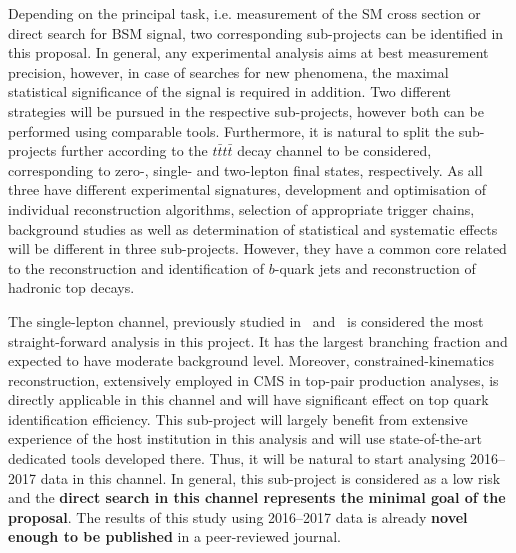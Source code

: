 Depending on the principal task, i.e. measurement of the SM cross section or direct search for BSM signal, two corresponding sub-projects can be identified in this proposal. In general, any experimental analysis aims at best measurement precision, however, in case of searches for new phenomena, the maximal statistical significance of the signal is required in addition.
%
Two different strategies will be pursued in the respective sub-projects, however both can be performed using comparable tools. Furthermore, it is natural to split the sub-projects further according to the $t\bar{t}t\bar{t}$ decay channel to be considered, corresponding to zero-, single- and two-lepton final states, respectively. As all three have different experimental signatures, development and optimisation of individual reconstruction algorithms, selection of appropriate trigger chains, background studies as well as determination of statistical and systematic effects will be different in three sub-projects. However, they have a common core related to the reconstruction and identification of $b$-quark jets and reconstruction of hadronic top decays.

The single-lepton channel, previously studied in~\cite{CMS:2016wig,Beck:2016hyi} and~\cite{Khachatryan:2014sca} is considered the most straight-forward analysis in this project. It has the largest branching fraction and expected to have moderate background level. Moreover, constrained-kinematics reconstruction, extensively employed in CMS in top-pair production analyses, is directly applicable in this channel and will have significant effect on top quark identification efficiency. This sub-project will largely benefit from extensive experience of the host institution in this analysis and will use state-of-the-art dedicated tools developed there. Thus, it will be natural to start analysing 2016--2017 data in this channel. In general, this sub-project is considered as a low risk and the \textbf{direct search in this channel represents the minimal goal of the proposal}. The results of this study using 2016--2017 data is already \textbf{novel enough to be published} in a peer-reviewed journal. 

